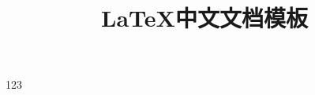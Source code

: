 \documentclass[a4paper, 12pt, UTF8]{ctexart}
\title{\bf \LaTeX 中文文档模板}
\begin{document}
    123
\end{document}

